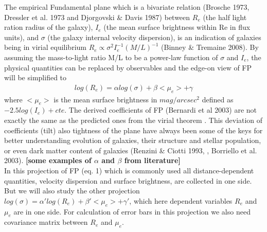 \documentclass{aa}
\begin{document}
The empirical Fundamental plane which is a bivariate relation (Brosche 1973, Dressler et al. 1973 and Djorgovski \& Davis 1987) between $R_e$ (the half light ration radius of the galaxy), $I_e$ (the mean surface brightness within Re in flux units), and $\sigma$ (the galaxy internal velocity dispersion), is an indication of galaxies being in virial equilibrium $R_e \propto \sigma^2 I_e^{-1} (M/L)^{-1}$ (Binney \& Tremaine 2008). By assuming the mass-to-light ratio M/L to be a power-law function of $\sigma$ and $I_e$, the physical quantities can be replaced by observables and the edge-on view of FP will be simplified to
\begin{eqnarray}
	log(R_e) = \alpha log(\sigma) + \beta <\mu_e> + \gamma
\end{eqnarray}
where $<\mu_e>$ is the mean surface brightness in $mag/arcsec^{2}$ defined as $-2.5log(I_e)+cte$. 
The derived coefficients of FP (Bernardi et al 2003) are not exactly the same as the predicted ones from the virial theorem . This deviation of coefficients (tilt) also tightness of the plane have always been some of the keys for better understanding evolution of galaxies, their structure and stellar population, or even dark matter content of galaxies (Renzini \& Ciotti 1993, ,  Borriello et al. 2003). \textbf{[some examples of $\alpha$ and $\beta$ from literature]}
\\In this projection of FP (eq. 1) which is commonly used all distance-dependent quantities, velocity dispersion and surface brightness, are collected in one side. But we will also study the other projection $log(\sigma) = \alpha' log(R_e) + \beta' <\mu_e> + \gamma'$, which here dependent variables $R_e$ and $\mu_e$ are in one side. For calculation of error bars in this projection we also need covariance matrix between $R_e$ and $\mu_e$.
\end{document}
